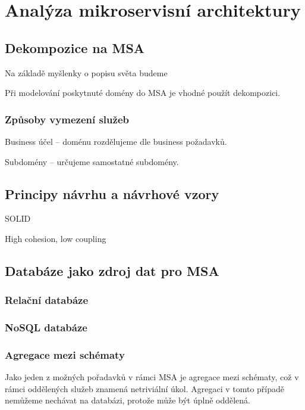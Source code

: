 \chapter{Analýza mikroservisní architektury}\label{ch:msa}







\section{Dekompozice na \gls{MSA}}

Na základě myšlenky o popisu světa budeme



Při modelování poskytnuté domény do \gls{MSA} je vhodné použít dekompozici.

\subsection{Způsoby vymezení služeb}

Business účel – doménu rozdělujeme dle business požadavků.

Subdomény – určujeme samostatné subdomény.


\section{Principy návrhu a návrhové vzory}

SOLID

High cohesion, low coupling



\section{Databáze jako zdroj dat pro \gls{MSA}}

\subsection{Relační databáze}


\subsection{NoSQL databáze}



\subsection{Agregace mezi schématy}
Jako jeden z možných pořadavků v rámci \gls{MSA} je agregace mezi schématy, což v rámci oddělených služeb znamená netriviální úkol.
Agregaci v tomto případě nemůžeme nechávat na databázi, protože může být úplně oddělená.


